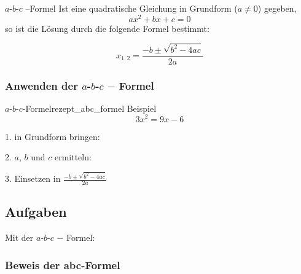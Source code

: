 \begin{gesetz}{$a$-$b$-$c$ --Formel}{}
Ist eine quadratische Gleichung in Grundform ($a\ne 0$) gegeben,
$$ax^2 + bx + c = 0$$
so ist die Lösung durch die folgende Formel bestimmt:

$$x_{1,2}=\frac{-b\pm\sqrt{b^2-4ac}}{2a}$$
\end{gesetz}
\newpage


\subsubsection{Anwenden der $a$-$b$-$c$ $-$ Formel}
\begin{rezept}{$a$-$b$-$c$-Formel}{rezept_abc_formel}
  Beispiel $$3x^2 = 9x - 6$$

  1. in Grundform bringen: 


2. $a$, $b$ und $c$ ermitteln:


3. Einsetzen in \large{ $\frac{-b \pm \sqrt{b^2-4ac}}{2a}$}

\end{rezept}

\subsection*{Aufgaben}
Mit der $a$-$b$-$c$ $-$ Formel:
\newpage

\newpage
\subsubsection{Beweis der abc-Formel }

